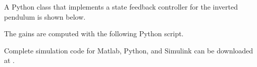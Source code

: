 A Python class that implements a state feedback controller for the inverted pendulum is shown below.


The gains are computed with the following Python script.


Complete simulation code for Matlab, Python, and Simulink can be downloaded at .


